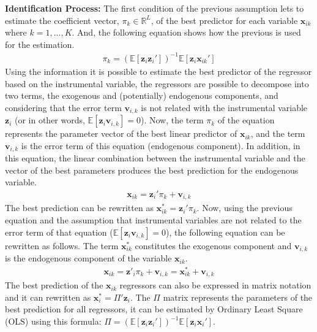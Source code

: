\documentclass{article}
\begin{document}
\textbf{Identification Process:}
\newline
The first condition of the previous assumption lets to estimate the coefficient vector, $\pi_{k} \in \mathbb{R}^{L}$, of the best predictor for each variable $\textbf{x}_{ik}$ where $k = 1,..., K$. And, the following equation shows how the previous is used for the estimation.
\begin{gather*}
\pi_{k} = (\mathbb{E}[\textbf{z}_{i} \textbf{z}_{i}'])^{-1}  \mathbb{E}[\textbf{z}_{i} \textbf{x}_{ik}']
\end{gather*}
Using the information it is possible to estimate the best predictor of the regressor based on the instrumental variable, the regressors are possible to decompose into two terms, the exogenous and (potentially) endogenous components, and considering that the error term $\textbf{v}_{i,k}$ is not related with the instrumental variable $\textbf{z}_{i}$ (or in other words, $\mathbb{E}[\textbf{z}_{i} \textbf{v}_{i,k}] = 0$). Now, the term $\pi_{k}$ of the equation represents the parameter vector of the best linear predictor of $\textbf{x}_{ik}$, and the term $\textbf{v}_{i,k}$ is the error term of this equation (endogenous component). In addition, in this equation, the linear combination between the instrumental variable and the vector of the best parameters produces the best prediction for the endogenous variable.
\begin{gather*}
\textbf{x}_{ik} = \textbf{z}_{i}' \pi_{k} + \textbf{v}_{i,k}
\end{gather*}
The best prediction can be rewritten as $\textbf{x}_{ik}^{*} = \textbf{z}_{i}' \pi_{k}$. Now, using the previous equation and the assumption that instrumental variables are not related to the error term of that equation ($\mathbb{E}[\textbf{z}_{i} \textbf{v}_{i,k}] = 0$), the following equation can be rewritten as follows. The term $\textbf{x}_{ik}^{*}$ constitutes the exogenous component and $\textbf{v}_{i,k}$ is the endogenous component of the variable $\textbf{x}_{ik}$.
\begin{gather*}
\textbf{x}_{ik} = \textbf{z}'_{i} \pi_{k} + \textbf{v}_{i,k} = \textbf{x}_{ik}^{*} + \textbf{v}_{i,k}
\end{gather*}
The best prediction of the $\textbf{x}_{ik}$ regressors can also be expressed in matrix notation and it can rewritten as $\textbf{x}_{i}^{*} =  \Pi' \textbf{z}_{i}$. The $\Pi$ matrix represents the parameters of the best prediction for all regressors, it can be estimated by Ordinary Least Square (OLS) using this formula: $\Pi = (\mathbb{E}[\textbf{z}_{i} \textbf{z}_{i}'])^{-1} \mathbb{E}[\textbf{z}_{i} \textbf{x}_{i}']$.
\end{document}
